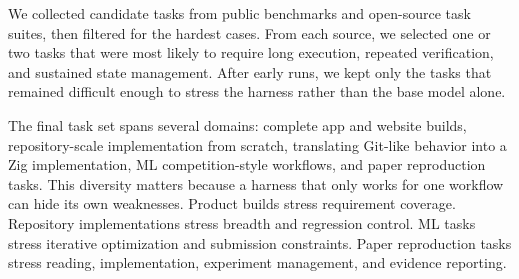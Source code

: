 \documentclass[11pt,a4paper]{article}
\begin{document}
We collected candidate tasks from public benchmarks and open-source task suites, then filtered for the hardest cases. From each source, we selected one or two tasks that were most likely to require long execution, repeated verification, and sustained state management. After early runs, we kept only the tasks that remained difficult enough to stress the harness rather than the base model alone.

The final task set spans several domains: complete app and website builds, repository-scale implementation from scratch, translating Git-like behavior into a Zig implementation, ML competition-style workflows, and paper reproduction tasks. This diversity matters because a harness that only works for one workflow can hide its own weaknesses. Product builds stress requirement coverage. Repository implementations stress breadth and regression control. ML tasks stress iterative optimization and submission constraints. Paper reproduction tasks stress reading, implementation, experiment management, and evidence reporting.
\end{document}
